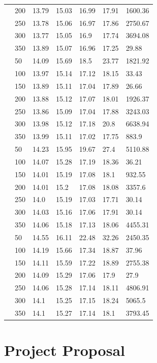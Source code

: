 \documentclass[12pt,a4paper,twoside,openany]{report}
\begin{document}
\begin{longtable}{@{} l l l l l l l @{}}
& 200 & 13.79 & 15.03 & 16.99 & 17.91 & 1600.36 \\
& 250 & 13.78 & 15.06 & 16.97 & 17.86 & 2750.67 \\
& 300 & 13.77 & 15.05 & 16.9 & 17.74 & 3694.08 \\
& 350 & 13.89 & 15.07 & 16.96 & 17.25 & 29.88 \\
\hline
\pagebreak[3]
80 & 50 & 14.09 & 15.69 & 18.5 & 23.77 & 1821.92 \\
& 100 & 13.97 & 15.14 & 17.12 & 18.15 & 33.43 \\
& 150 & 13.89 & 15.11 & 17.04 & 17.89 & 26.66 \\
& 200 & 13.88 & 15.12 & 17.07 & 18.01 & 1926.37 \\
& 250 & 13.86 & 15.09 & 17.04 & 17.88 & 3243.03 \\
& 300 & 13.98 & 15.12 & 17.18 & 20.8 & 6638.94 \\
& 350 & 13.99 & 15.11 & 17.02 & 17.75 & 883.9 \\
\hline
\pagebreak[4]
90 & 50 & 14.23 & 15.95 & 19.67 & 27.4 & 5110.88 \\
& 100 & 14.07 & 15.28 & 17.19 & 18.36 & 36.21 \\
& 150 & 14.01 & 15.19 & 17.08 & 18.1 & 932.55 \\
& 200 & 14.01 & 15.2 & 17.08 & 18.08 & 3357.6 \\
& 250 & 14.0 & 15.19 & 17.03 & 17.71 & 30.14 \\
& 300 & 14.03 & 15.16 & 17.06 & 17.91 & 30.14 \\
& 350 & 14.06 & 15.18 & 17.13 & 18.06 & 4455.31 \\
\hline
\pagebreak[3]
100 & 50 & 14.55 & 16.11 & 22.48 & 32.26 & 2450.35 \\
& 100 & 14.19 & 15.66 & 17.34 & 18.87 & 37.96 \\
& 150 & 14.11 & 15.59 & 17.22 & 18.89 & 2755.38 \\
& 200 & 14.09 & 15.29 & 17.06 & 17.9 & 27.9 \\
& 250 & 14.06 & 15.28 & 17.14 & 18.11 & 4806.91 \\
& 300 & 14.1 & 15.25 & 17.15 & 18.24 & 5065.5 \\
& 350 & 14.1 & 15.27 & 17.14 & 18.1 & 3793.45 \\
\bottomrule
\end{longtable}

\chapter{Project Proposal}


\end{document}

